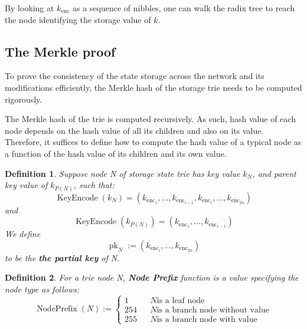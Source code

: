 \documentclass{article}
\newcommand{\assign}{:=}
\newcommand{\tmop}[1]{\ensuremath{\operatorname{#1}}}
\newcommand{\tmstrong}[1]{\textbf{#1}}
\newcommand{\tmtextbf}[1]{{\bfseries{#1}}}
\newtheorem{definition}{Definition}
\providecommand{\tmop}[1]{\ensuremath{\mathrm{#1}}}
\providecommand{\tmstrong}[1]{\tmtextbf{#1}}
\providecommand{\tmtextbf}[1]{\tmtextbf{#1}}
\newtheorem{definition}{Definition}
\begin{document}
By looking at $k_{\tmop{enc}}$ as a sequence of nibbles, one can walk the
radix tree to reach the node identifying the storage value of $k$.

\subsection{The Merkle proof}\label{sect-merkl-proof}

To prove the consistency of the state storage across the network and its
modifications efficiently, the Merkle hash of the storage trie needs to be
computed rigorously.

The Merkle hash of the trie is computed recursively. As such, hash value of
each node depends on the hash value of all its children and also on its value.
Therefore, it suffices to define how to compute the hash value of a typical
node as a function of the hash value of its children and its own value.

\begin{definition}
  Suppose node N of storage state trie has key value $k_N$, and parent key
  value of $k_{P (N)}$, such that:
  \[ \tmop{KeyEncode} (k_N) = (k_{\tmop{enc}_1}, \ldots, k_{\tmop{enc}_{i -
     1}}, k_{\tmop{enc}_i}, \ldots, k_{\tmop{enc}_{2 n}}) \]
  and
  \[ \tmop{KeyEncode} (k_{P (N)}) = (k_{\tmop{enc}_1}, \ldots,
     k_{\tmop{enc}_{i - 1}}) \]
  We define
  \[ \tmop{pk}_N \assign (k_{\tmop{enc}_i}, \ldots, k_{\tmop{enc}_{2 n}}) \]
  to be the {\tmstrong{the partial key}} of N.
\end{definition}

\begin{definition}
  \label{def-node-prefix}For a trie node N, {\tmstrong{Node Prefix }}function
  is a value specifying the node type as follows:
  \[ \tmop{NodePrefix} (N) \assign \left\{ \begin{array}{lll}
       1 &  & N \text{is a leaf node}\\
       254 &  & N \text{is a branch node without value}\\
       255 &  & N \text{is a branch node with value}
     \end{array} \right. \]
\end{definition}
\end{document}
